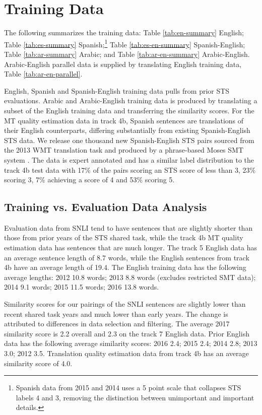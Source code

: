 \documentclass[11pt,a4paper]{article}
\begin{document}
\section{Training Data}
The following summarizes the training data: Table \ref{tab:en-summary} English; Table \ref{tab:es-summary} Spanish;\footnote{Spanish data from 2015 and 2014 uses a 5 point scale that collapses STS labels 4 and 3, removing the distinction between unimportant and important details.} Table \ref{tab:es-en-summary} Spanish-English; Table \ref{tab:ar-summary} Arabic; and Table \ref{tab:ar-en-summary} Arabic-English. Arabic-English parallel data is supplied by translating English training data, Table \ref{tab:ar-en-parallel}. 

English, Spanish and Spanish-English training data pulls from prior STS evaluations. Arabic and Arabic-English training data is produced by translating a subset of the English training data and transferring the similarity scores. For the MT quality estimation data in track 4b, Spanish sentences are translations of their English counterparts, differing substantially from existing Spanish-English STS data. We release one thousand new Spanish-English STS pairs sourced from the 2013 WMT translation task and produced by a phrase-based Moses SMT system \cite{bojar-EtAl:2013:WMT}. The data is expert annotated and has a similar label distribution to the track 4b test data with 17\% of the pairs scoring an STS score of less than 3, 23\% scoring 3, 7\% achieving a score of 4 and 53\% scoring 5. 

\subsection{Training vs. Evaluation Data Analysis}

Evaluation data from SNLI tend to have sentences that are slightly shorter than those from prior years of the STS shared task, while the track 4b MT quality estimation data has sentences that are much longer. The track 5 English data has an average sentence length of 8.7 words, while the English sentences from track 4b have an average length of 19.4. The English training data has the following average lengths: 2012 10.8 words; 2013 8.8 words (excludes restricted SMT data); 2014 9.1 words; 2015 11.5 words; 2016 13.8 words.

Similarity scores for our pairings of the SNLI sentences are slightly lower than recent shared task years and much lower than early years. The change is attributed to differences in data selection and filtering. The average 2017 similarity score is 2.2 overall and 2.3 on the track 7 English data. Prior English data has the following average similarity scores: 2016 2.4; 2015 2.4; 2014 2.8; 2013 3.0; 2012 3.5. Translation quality estimation data from track 4b has an average similarity score of 4.0. 
\end{document}
